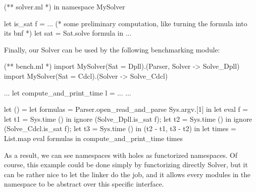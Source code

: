 \documentclass[11pt,a4paper]{article}
\begin{document}
\medskip 

\begin{OCaml}
(** solver.ml *)
in namespace MySolver

let is_sat f =
... 
(* some preliminary computation, like turning the formula into its bnf *)
  let sat = Sat.solve formula in 
...
\end{OCaml}

\medskip

Finally, our Solver can be used by the following benchmarking module:

\begin{OCaml}
(** bench.ml *)
import MySolver(Sat = Dpll).(Parser, Solver -> Solve_Dpll)
import MySolver(Sat = Cdcl).(Solver -> Solve_Cdcl)

...
let compute_and_print_time l = ...
...

let () =
  let formulas = 
    Parser.open_read_and_parse Sys.argv.[1] in
  let eval f =
    let t1 = Sys.time () in
    ignore (Solve_Dpll.is_sat f);
    let t2 = Sys.time () in
    ignore (Solve_Cdcl.is_sat f);
    let t3 = Sys.time () in
    (t2 - t1, t3 - t2)
  in
  let times = List.map eval formulas in
  compute_and_print_time times
\end{OCaml}

\medskip

As a result, we can see namespaces with holes as functorized namespaces. Of
course, this example could be done simply by functorizing directly Solver, but
it can be rather nice to let the linker do the job, and it allows every modules
in the namespace to be abstract over this specific interface.


 
\end{document}
